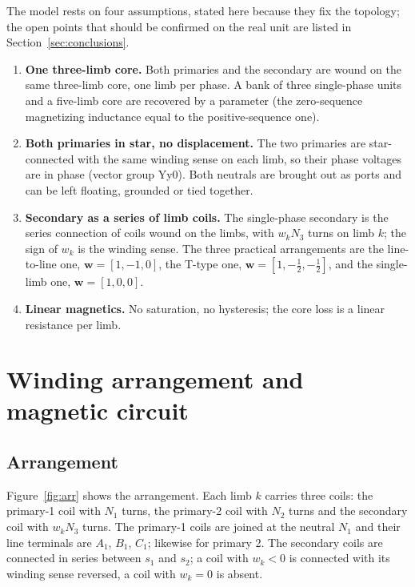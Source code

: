 \documentclass[10pt,a4paper]{scrartcl}
\newcommand{\vect}[1]{\boldsymbol{#1}}
\begin{document}
\begin{onehalfspace}
The model rests on four assumptions, stated here because they fix the topology; the open points that should be confirmed on the real unit are listed in Section~\ref{sec:conclusions}.
\begin{enumerate}
\item \textbf{One three-limb core.} Both primaries and the secondary are wound on the same three-limb core, one limb per phase. A bank of three single-phase units and a five-limb core are recovered by a parameter (the zero-sequence magnetizing inductance equal to the positive-sequence one).
\item \textbf{Both primaries in star, no displacement.} The two primaries are star-connected with the same winding sense on each limb, so their phase voltages are in phase (vector group Yy0). Both neutrals are brought out as ports and can be left floating, grounded or tied together.
\item \textbf{Secondary as a series of limb coils.} The single-phase secondary is the series connection of coils wound on the limbs, with $w_k N_3$ turns on limb $k$; the sign of $w_k$ is the winding sense. The three practical arrangements are the line-to-line one, $\vect{w}=[1,-1,0]$, the T-type one, $\vect{w}=[1,-\tfrac12,-\tfrac12]$, and the single-limb one, $\vect{w}=[1,0,0]$.
\item \textbf{Linear magnetics.} No saturation, no hysteresis; the core loss is a linear resistance per limb.
\end{enumerate}

\section{Winding arrangement and magnetic circuit}

\subsection{Arrangement}

Figure~\ref{fig:arr} shows the arrangement. Each limb $k$ carries three coils: the primary-1 coil with $N_1$ turns, the primary-2 coil with $N_2$ turns and the secondary coil with $w_k N_3$ turns. The primary-1 coils are joined at the neutral $N_1$ and their line terminals are $A_1$, $B_1$, $C_1$; likewise for primary 2. The secondary coils are connected in series between $s_1$ and $s_2$; a coil with $w_k<0$ is connected with its winding sense reversed, a coil with $w_k=0$ is absent.


\end{onehalfspace}
\end{document}
